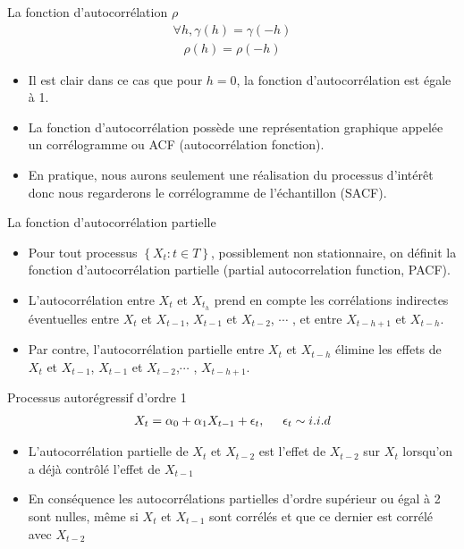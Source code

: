 \documentclass{beamer}
\begin{document}
\begin{frame}{La fonction d’autocorrélation $\rho$}
\begin{align*}
\forall h, \gamma (h)= \gamma (-h) 
\end{align*}
\begin{align*}
\rho (h)= \rho (-h)
\end{align*}
\begin{itemize}
\item Il est clair dans ce cas que pour $h = 0$, la fonction d’autocorrélation est égale à 1. 
\item La fonction d’autocorrélation possède une représentation graphique appelée un corrélogramme ou ACF (autocorrélation fonction). 
\item En pratique, nous aurons seulement une réalisation du processus d’intérêt donc nous regarderons le corrélogramme de l’échantillon (SACF). 
\end{itemize}
\end{frame}

\begin{frame}{La fonction d’autocorrélation partielle}
\begin{itemize}
\item Pour tout processus $\left\{ X_t : t \in T \right\}$, possiblement non stationnaire, on définit la fonction d’autocorrélation partielle (partial autocorrelation function, PACF).
\item L’autocorrélation entre $X_t$ et $X_{t_h}$ prend en compte les corrélations indirectes éventuelles entre $X_t$ et $X_{t-1}$, $X_{t-1}$ et $X_{t-2}$, $\cdots$ , et entre $X_{t-h+1}$ et $X_{t-h}$.
\item Par contre, l’autocorrélation partielle entre $X_t$ et $X_{t-h}$ élimine les effets de $X_t$ et $X_{t-1}$, $X_{t-1}$ et $X_{t-2}$,$\cdots$ , $X_{t-h+1}$.
\end{itemize}
\end{frame}

\begin{frame}{Processus autorégressif d’ordre 1}
\begin{align*}
X_t = \alpha_0 +\alpha_1 X_{t-1}+\epsilon_t, \hspace{0.5cm} \epsilon_t \sim
 i.i.d
\end{align*}
\begin{itemize}
\item L’autocorrélation partielle de $X_{t}$ et $X_{t-2}$ est l’effet de $X_{t-2}$ sur $X_t$ lorsqu’on a déjà contrôlé l’effet de $X_{t-1}$
\item En conséquence les autocorrélations partielles d’ordre supérieur ou égal à 2 sont nulles, même si $X_t$ et $X_{t-1}$ sont corrélés et que ce dernier est corrélé avec $X_{t-2}$
\end{itemize}
\end{frame}
\end{document}
